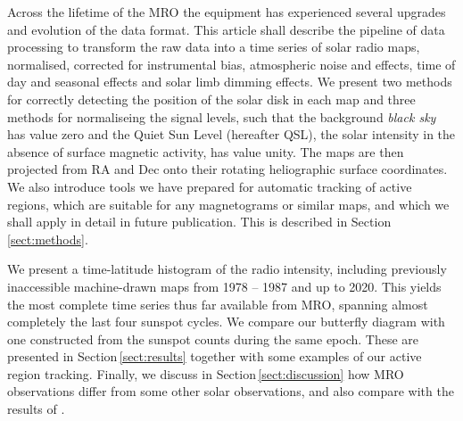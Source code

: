 \documentclass{aa}
\begin{document}
  Across the lifetime of the MRO the equipment has experienced several upgrades
  and evolution of the data format.
  This article shall describe the pipeline of data processing to transform the
  raw data into a time series of solar radio maps, normalised, corrected for
  instrumental bias, atmospheric noise and effects, time of day and seasonal
  effects and solar limb dimming effects.
  We present two methods for correctly detecting the position of the solar disk
  in each map and three methods for normaliseing the signal levels, such that
  the background \emph{black sky} has value zero and the 
  Quiet Sun Level (hereafter QSL),
  the solar intensity in the absence of surface magnetic activity, has
  value unity.
  The maps are then projected from RA and Dec onto their rotating heliographic
  surface coordinates.
  We also introduce tools we have prepared for automatic tracking of active 
  regions, which are suitable for any magnetograms or similar maps, and which
  we shall apply in detail in future publication.
  This is described in Section\,\ref{sect:methods}.

  We present a time-latitude histogram of the radio intensity,
  including previously inaccessible machine-drawn maps from 1978 -- 1987 and
  up to 2020.
  This yields the most complete time series thus far available from MRO, 
  spanning almost completely the last four sunspot cycles.
  We compare our butterfly diagram with one constructed from the sunspot 
  counts during the same epoch.
  These are presented in Section\,\ref{sect:results} together with some 
  examples of our active region tracking.
  Finally, we discuss in Section\,\ref{sect:discussion} 
  how MRO observations differ from some other solar observations, 
  and also compare with the results of \citet{Shibasaki13}. 
\end{document}
